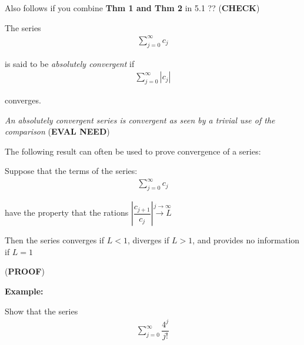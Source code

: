 \par\bigskip
\noindent Also follows if you combine \textbf{Thm 1 and Thm 2} in 5.1 ?? (\textbf{CHECK})
\par\bigskip
\begin{theo}{}
  The series
  \begin{equation*}
    \begin{gathered}
      \sum_{j=0}^{\infty}c_j
    \end{gathered}
  \end{equation*}\par
  \noindent is said to be \textit{absolutely convergent} if
  \begin{equation*}
    \begin{gathered}
      \sum_{j=0}^{\infty}\left|c_j\right|
    \end{gathered}
  \end{equation*}\par
  \noindent converges.
\end{theo}
\par\bigskip
\noindent\textit{An absolutely convergent series is convergent as seen by a trivial use of the comparison} (\textbf{EVAL NEED})
\par\bigskip
\noindent The following result can often be used to prove convergence of a series:
\par\bigskip
\begin{theo}{}
  Suppose that the terms of the series:
  \begin{equation*}
    \begin{gathered}
      \sum_{j=0}^{\infty}c_j
    \end{gathered}
  \end{equation*}\par
  \noindent have the property that the rations $\left|\dfrac{c_{j+1}}{c_j}\right|\stackrel{j\to\infty}{\to L}$
  \par\bigskip
  \noindent Then the series converges if $L<1$, diverges if $L>1$, and provides no information if $L = 1$ 
\end{theo}
\par\bigskip
\noindent (\textbf{PROOF}) 
\par\bigskip
\noindent\textbf{Example:}\par
\noindent Show that the series
\begin{equation*}
  \begin{gathered}
    \sum_{j=0}^{\infty}\dfrac{4^j}{j!}
  \end{gathered}
\end{equation*}\par
